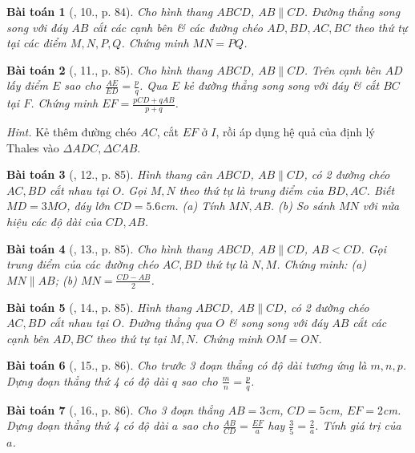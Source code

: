 \documentclass{article}
\newtheorem{baitoan}{Bài toán}
\begin{document}
\begin{baitoan}[\cite{SBT_Toan_8_tap_2}, 10., p. 84]
	Cho hình thang $ABCD$, $AB\parallel CD$. Đường thẳng song song với đáy $AB$ cắt các cạnh bên \& các đường chéo $AD,BD,AC,BC$ theo thứ tự tại các điểm $M,N,P,Q$. Chứng minh $MN = PQ$.
\end{baitoan}

\begin{baitoan}[\cite{SBT_Toan_8_tap_2}, 11., p. 85]
	Cho hình thang $ABCD$, $AB\parallel CD$. Trên cạnh bên $AD$ lấy điểm $E$ sao cho $\frac{AE}{ED} = \frac{p}{q}$. Qua $E$ kẻ đường thẳng song song với đáy \& cắt $BC$ tại $F$. Chứng minh $EF = \frac{pCD + qAB}{p + q}$.
\end{baitoan}
\noindent\textit{Hint.} Kẻ thêm đường chéo $AC$, cắt $EF$ ở $I$, rồi áp dụng hệ quả của định lý Thales vào $\Delta ADC,\Delta CAB$.

\begin{baitoan}[\cite{SBT_Toan_8_tap_2}, 12., p. 85]
	Hình thang cân $ABCD$, $AB\parallel CD$, có 2 đường chéo $AC,BD$ cắt nhau tại $O$. Gọi $M,N$ theo thứ tự là trung điểm của $BD,AC$. Biết $MD = 3MO$, đáy lớn $CD = 5.6$\emph{cm}. (a) Tính $MN,AB$. (b) So sánh $MN$ với nửa hiệu các độ dài của $CD,AB$.
\end{baitoan}

\begin{baitoan}[\cite{SBT_Toan_8_tap_2}, 13., p. 85]
	Cho hình thang $ABCD$, $AB\parallel CD$, $AB < CD$. Gọi trung điểm của các đường chéo $AC,BD$ thứ tự là $N,M$. Chứng minh: (a) $MN\parallel AB$; (b) $MN = \frac{CD - AB}{2}$.
\end{baitoan}

\begin{baitoan}[\cite{SBT_Toan_8_tap_2}, 14., p. 85]
	Hình thang $ABCD$, $AB\parallel CD$, có 2 đường chéo $AC,BD$ cắt nhau tại $O$. Đường thẳng qua $O$ \& song song với đáy $AB$ cắt các cạnh bên $AD,BC$ theo thứ tự tại $M,N$. Chứng minh $OM = ON$.
\end{baitoan}

\begin{baitoan}[\cite{SBT_Toan_8_tap_2}, 15., p. 86]
	Cho trước 3 đoạn thẳng có độ dài tương ứng là $m,n,p$. Dựng đoạn thẳng thứ 4 có độ dài $q$ sao cho $\frac{m}{n} = \frac{p}{q}$.
\end{baitoan}

\begin{baitoan}[\cite{SBT_Toan_8_tap_2}, 16., p. 86]
	Cho 3 đoạn thẳng $AB = 3$\emph{cm}, $CD = 5$\emph{cm}, $EF = 2$\emph{cm}. Dựng đoạn thẳng thứ 4 có độ dài $a$ sao cho $\frac{AB}{CD} = \frac{EF}{a}$ hay $\frac{3}{5} = \frac{2}{a}$. Tính giá trị của $a$.
\end{baitoan}
\end{document}
